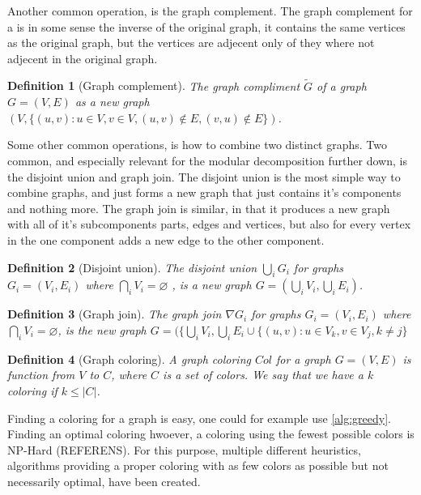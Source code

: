 \documentclass{amsart}
\newtheorem{definition}{Definition}[section]
\begin{document}
Another common operation, is the graph complement. The graph complement for a
is in some sense the inverse of the original graph, it contains the same
vertices as the original graph, but the vertices are adjecent only of they where
not adjecent in the original graph.

\begin{definition}[Graph complement]
    The graph compliment $\widetilde{G}$ of a graph $G = (V,E)$ as a new graph 
    $(V,\{ (u,v) : u \in V,v \in V, (u,v) \notin E,(v,u) \notin E\})$.
\end{definition}

Some other common operations, is how to combine two distinct graphs. Two common,
and especially relevant for the modular decomposition further down, is the
disjoint union and graph join. The disjoint union is the most simple way to
combine graphs, and just forms a new graph that just contains it's components
and nothing more. 
The graph join is similar, in that it produces a new graph with all of it's
subcomponents parts, edges and vertices, but also for every vertex in the one
component adds a new edge to the other component.

\begin{definition}[Disjoint union]
    The disjoint union $\bigcup_i G_i$ for graphs $G_i = (V_i,E_i)$ where 
    $\bigcap_i V_i = \varnothing $ , is a new graph
    $G = \left( \bigcup_i V_i,\bigcup_i E_i \right)$.
\end{definition}

\begin{definition}[Graph join]
    The graph join $\nabla G_i$ for graphs $G_i = (V_i,E_i)$ where 
    $\bigcap_i V_i = \varnothing$, is the new graph $G = (\{\bigcup_i V_i,
    \bigcup_i E_i \cup \{(u,v) : u \in V_k, v \in V_j, k \neq j \}$
\end{definition}


\begin{definition}[Graph coloring]
    A graph coloring $Col$ for a graph $G = (V,E)$
    is function from $V$ to $C$, where $C$ is a set of colors. We say that 
    we have a $k$ coloring if $k \leq |C|$.
\end{definition}

Finding a coloring for a graph is easy, one could for example use
\autoref{alg:greedy}. Finding an optimal coloring hwoever, a coloring using the
fewest possible colors is NP-Hard (REFERENS). For this purpose, multiple
different heuristics, algorithms providing a proper coloring with as few colors
as possible but not necessarily optimal, have been created.
\end{document}

